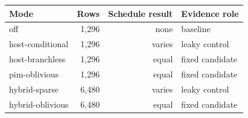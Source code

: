 \begin{tabular}{lrrl}
\toprule
Mode & Rows & Schedule result & Evidence role \\
\midrule
off & 1,296 & none & baseline \\
host-conditional & 1,296 & varies & leaky control \\
host-branchless & 1,296 & equal & fixed candidate \\
pim-oblivious & 1,296 & equal & fixed candidate \\
hybrid-sparse & 6,480 & varies & leaky control \\
hybrid-oblivious & 6,480 & equal & fixed candidate \\
\bottomrule
\end{tabular}
